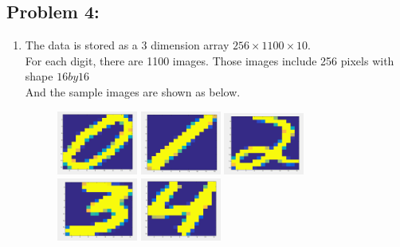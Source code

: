 \documentclass{article}
\begin{document}
\hypertarget{problem_0_homework_checklist_2}{}
\subsection*{{Problem 4: }}
\label{}
\begin{enumerate} 
\item 
The data is stored as a 3 dimension array $256\times 1100 \times 10$. \\
 For each digit, there are 1100 images.  Those images include 256 pixels with shape $16 by 16 $ \\ And the sample images are shown as below. \\
 \begin{figure}
 \includegraphics[width=0.25\textwidth, height=0.25\textwidth]{pic0}
\includegraphics[width=0.25\textwidth, height=0.25\textwidth]{pic1}   \includegraphics[width=0.25\textwidth, height=0.25\textwidth]{pic2}
\includegraphics[width=0.25\textwidth, height=0.25\textwidth]{pic3}
\includegraphics[width=0.25\textwidth, height=0.25\textwidth]{pic4}

\end{figure}
\end{enumerate}
\end{document}

